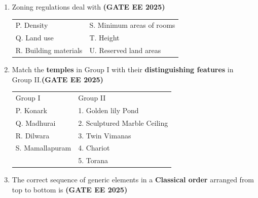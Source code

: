 \documentclass[journal,12pt,onecolumn]{IEEEtran}
\theoremstyle{remark}
\begin{document}
\begin{enumerate}
\begin{enumerate}
\end{enumerate}
\item Zoning regulations deal with \hfill \textbf{(GATE EE 2025)}
\newline
  \begin{tabular}{p{}p{}}
P. Density     & S. Minimum areas of rooms \\
Q. Land use    & T. Height\\
R. Building materials&U. Reserved land areas\\
\end{tabular}
\begin{enumerate}
\end{enumerate}
\item Match the \textbf{temples} in Group I with their \textbf{distinguishing features} in Group II.\hfill \textbf{(GATE EE 2025)}
\newline
\begin{tabular}{p{}p{}}
Group I     & Group II \\
P. Konark     & 1. Golden lily Pond\\
Q. Madhurai &2. Sculptured Marble Ceiling\\
R. Dilwara & 3. Twin Vimanas\\
S. Mamallapuram & 4. Chariot\\
  & 5. Torana\\
\end{tabular}
\begin{enumerate}
\end{enumerate}
\item The correct sequence of  generic elements in a \textbf{Classical order} arranged from top to bottom is \hfill \textbf{(GATE EE 2025)}

\end{enumerate}
\end{document}
